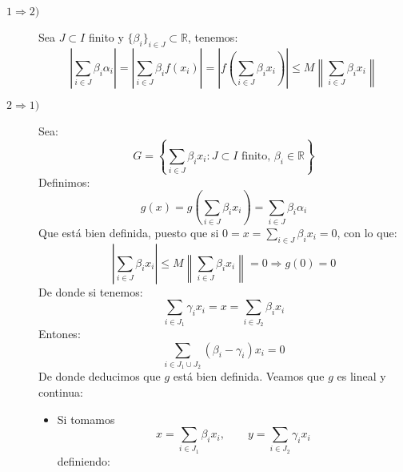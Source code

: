 \begin{ejercicio}
    \noindent
    \begin{description}
        \item [$1 \Longrightarrow 2)$] Sea $J\subset I$ finito y $\{\beta_i\}_{i \in J}\subset \mathbb{R}$, tenemos:
            \begin{equation*}
                \left|\sum_{i \in J}\beta_i \alpha_i\right| = \left|\sum_{i \in J} \beta_i f(x_i)\right| = \left|f\left(\sum_{i \in J} \beta_i x_i\right)\right| \leq M \left\|\sum_{i \in J} \beta_i x_i\right\|
            \end{equation*}
        \item [$2 \Longrightarrow 1)$] Sea:
            \begin{equation*}
                G = \left\{\sum_{i \in J} \beta_i x_i : J\subset I \text{\ finito,\ } \beta_i \in \mathbb{R}\right\}
            \end{equation*}
            Definimos:
            \begin{equation*}
                g(x) = g\left(\sum_{i \in J}\beta_i x_i\right) = \sum_{i \in J} \beta_i \alpha_i
            \end{equation*}
            Que está bien definida, puesto que si $0 = x = \sum_{i \in J}\beta_i x_i = 0$, con lo que:
            \begin{equation*}
                \left|\sum_{i \in J}\beta_i x_i\right| \leq M \left\|\sum_{i \in J} \beta_i x_i \right\| = 0 \Longrightarrow g(0) = 0
            \end{equation*} 
            De donde si tenemos:
            \begin{equation*}
                \sum_{i \in J_1}\gamma_i x_i = x = \sum_{i \in J_2}\beta_i x_i
            \end{equation*}
            Entones:
            \begin{equation*}
                \sum_{i \in J_1\cup J_2}(\beta_i - \gamma_i)x_i = 0
            \end{equation*}
            De donde deducimos que $g$ está bien definida. Veamos que $g$ es lineal y continua:
            \begin{itemize}
                \item Si tomamos
                    \begin{equation*}
                        x = \sum_{i \in J_1} \beta_i x_i, \qquad y = \sum_{i \in J_2}\gamma_i x_i
                    \end{equation*}
                    definiendo:
                    \begin{equation*}

\end{equation*}
\end{itemize}
\end{description}
\end{ejercicio}
